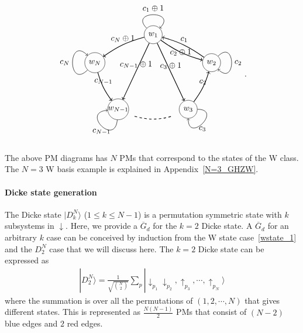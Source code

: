 \documentclass[a4paper,twocolumn,8pt,accepted=2021-12-15]{quantumarticle}
\def\>{\rangle}
\def\dc{{\overline{G}_d }}
\begin{document}
	\begin{align}\label{wbasis_2}
		\begin{tikzpicture}[baseline={([yshift=-.5ex]current bounding box.center)}]
			\node[circle,draw] (a) at (6,2.7) {$w_1$};
			\node[circle,draw] (b) at (8.5,1.5) {$w_2$};		
			\node[circle,draw] (c) at (7.5,-.5) {$w_3$};
			\node[circle,minimum size =0.9cm, draw] (d) at (4.5,-.5) { };
			\node[circle,draw] (e) at (3.5,1.5) {$w_N$};	
			\path[every loop/.style={min distance=10mm,in=45,out=135,looseness=5,->},line width = 0.5pt] (a) edge [loop above]  node[above] {$c_1\oplus 1$}   (a);
			\path[every loop/.style={min distance=10mm,in=-45,out=45,looseness=5},line width = 0.5pt,->] (b) edge [loop above]  node[right] {$c_2$}  (b);
			\path[every loop/.style={min distance=10mm,in=270,out=0,looseness=5,->},line width = 0.5pt] (c) edge [loop above]  node[below] {$c_3$}  (c);
			\path[every loop/.style={min distance=10mm,in=185,out=265,looseness=5,->},line width = 0.5pt] (d) edge [loop above]   node[below] {$c_{N-1}$}  (d);
			\path[every loop/.style={min distance=10mm,in=135,out=-135,looseness=5,->},line width = 0.5pt] (e) edge [loop above]  node[left] {$c_N$}   (e);				
			\path[line width = 0.8pt,->] (a) edge[bend right=10]  node[above] {$c_N\oplus 1$}  (e);
			\path[line width = 0.8pt,->] (e) edge[bend right=10]  node[above] {$c_{N-1}$}  (d);
			\path[line width = 0.8pt,->] (c) edge[bend right=10]  node[above] {$c_2$}  (b);
			\path[line width = 0.8pt,->] (b) edge[bend right=10]  node[above] {$c_1$}  (a);
			\path[line width = 0.8pt,->] (a) edge  node[above] {$c_{N-1}\oplus 1$}  (d);
			\path[line width = 0.8pt,->] (a) edge  node[above] {$c_3\oplus 1$}  (c);
			\path[line width = 0.8pt,->] (a) edge[bend right=10]  node {$c_2\oplus 1$}  (b);
			\draw[thick, dashed] (5.2,-0.8) to[bend right=15] (6.8,-.8);		
			\draw (4.5,-.5) node {$w_{N-1}$};	
		\end{tikzpicture}.
	\end{align} 
	The above PM diagrams has $N$ PMs that correspond to the states of the W class. The $N=3$ W basis example is explained in Appendix~\ref{N=3_GHZW}.
	
	
	\paragraph{Dicke state generation} The Dicke state $|D_k^N\>$ ($1\le k \le N-1$) is a permutation symmetric state  with $k$ subsystems in $\downarrow$. Here, we provide a $\dc$ for the $k=2$ Dicke state.
	A $\dc$ for an arbitrary $k$ case can be conceived by induction from the W state case~\eqref{wstate_1} and the $D_2^N$ case that we will discuss here.
	The $k=2$ Dicke state can be expressed as
	\begin{align}
		|D_2^N\> = \frac{1}{\sqrt{\binom{N}{2}}} \sum_{p}|\downarrow_{p_1}\downarrow_{p_2},\uparrow_{p_3},\cdots,\uparrow_{p_N}\>
	\end{align} where the summation is over all the permutations of $(1,2,\cdots, N)$ that gives different states. This is represented as $\frac{N(N-1)}{2}$ PMs that consist of $(N-2)$ blue edges and $2$ red edges. %
	
\end{document}

